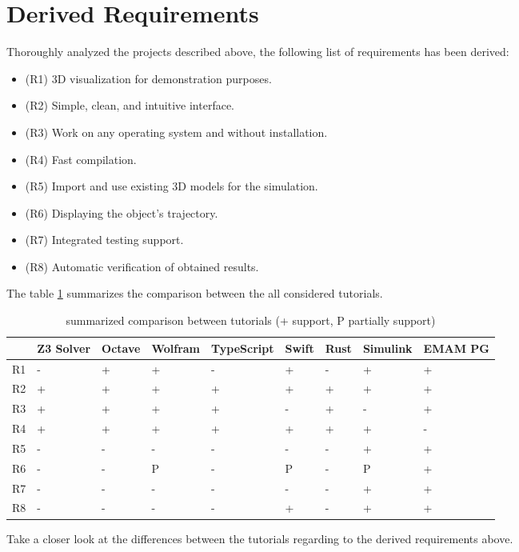 \section{Derived Requirements}
Thoroughly analyzed the projects described above, the following list of requirements has been derived: \newline 
\begin{itemize}
    \item (R1) 3D visualization for demonstration purposes.
    \item (R2) Simple, clean, and intuitive interface.
    \item (R3) Work on any operating system and without installation.
    \item (R4) Fast compilation.
    \item (R5) Import and use existing 3D models for the simulation.
    \item (R6) Displaying the object's trajectory.
    \item (R7) Integrated testing support.
    \item (R8) Automatic verification of obtained results.
\end{itemize}
The table \ref{comparison} summarizes the comparison between the all considered tutorials. \newline
\begin{table}[h!] \caption{summarized comparison between tutorials (+ support, P partially support)} \label{comparison}
    \begin{tabular}{|l|l|l|l|l|l|l|l|l|} 
    \hline
    &  Z3 Solver & Octave & Wolfram & TypeScript & Swift & Rust & Simulink & EMAM PG \\ \hline
    R1 & - & + & + & - & + & - & + & + \\ \hline
    R2 & + & + & + & + & + & + & + & + \\ \hline
    R3 & + & + & + & + & - & + & - & + \\ \hline
    R4 & + & + & + & + & + & + & + & - \\ \hline
    R5 & - & - & - & - & - & - & + & + \\ \hline
    R6 & - & - & P & - & P & - & P & + \\ \hline
    R7 & - & - & - & - & - & - & + & + \\ \hline
    R8 & - & - & - & - & + & - & + & + \\ \hline
    \end{tabular}
\end{table}
Take a closer look at the differences between the tutorials regarding to the derived requirements above. \newline
